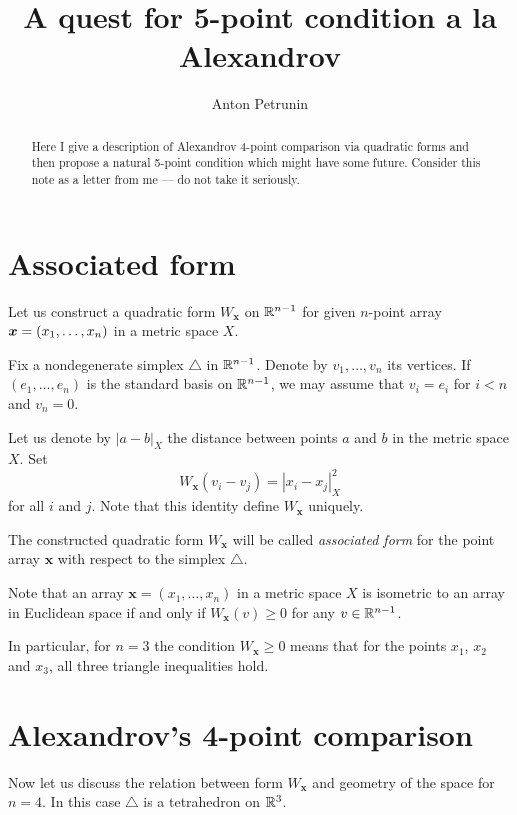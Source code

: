 \documentclass[oneside,a4paper]{amsart}
\begin{document}
\title{A quest for 5-point condition a la Alexandrov}
\author{Anton Petrunin}
\date{}
\begin{abstract}
Here I give a description of Alexandrov 4-point comparison
via quadratic forms
and then propose a natural 5-point condition which might have some future.
Consider this note as a letter from me --- do not take it seriously.
\end{abstract}
\maketitle

\section*{Associated form}

Let us construct a quadratic form $W_{\bm{x}}$ on $\mathbb{R}^{n-1}$ 
for given $n$-point array $\bm{x}\z=(x_1,\dots,x_n)$ in a metric space $X$.

Fix a nondegenerate simplex $\triangle$ in $\mathbb{R}^{n-1}$.
Denote by $v_1,\dots,v_n$ its vertices.
If $(e_1,\dots,e_n)$ is the standard basis on $\mathbb{R}^{n-1}$,
we may assume that $v_i=e_i$ for $i<n$ and $v_n=0$.

Let us denote by $|a-b|_X$ the distance between points $a$ and $b$ in the metric space $X$.
Set
\[W_{\bm{x}}(v_i-v_j)=|x_i-x_j|^2_X\] 
for all $i$ and $j$.
Note that this identity define $W_{\bm{x}}$ uniquely.


The constructed quadratic form $W_{\bm{x}}$ will be called \emph{associated form} for the point array $\bm{x}$ with respect to the simplex $\triangle$.

Note that an array $\bm{x}=(x_1,\dots,x_n)$ in a metric space $X$ is isometric to an array in Euclidean space if and only if 
$W_{\bm{x}}(v)\ge 0$
for any $v\in \mathbb{R}^{n-1}$.

In particular, for $n=3$ the
condition $W_{\bm{x}}\ge 0$ means that for the points $x_1$, $x_2$ and $x_3$,
all three triangle inequalities hold. 

\section*{Alexandrov's 4-point comparison}

Now let us discuss the relation between form $W_{\bm{x}}$
and geometry of the space for $n=4$.
In this case $\triangle$ is a tetrahedron on $\mathbb{R}^3$.
\end{document}
